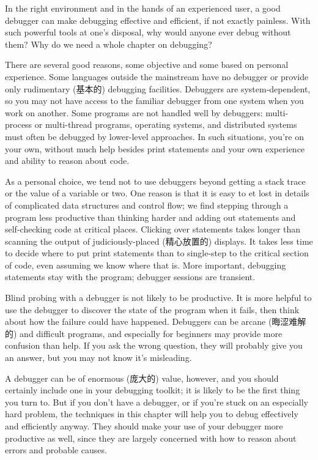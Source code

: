 In the right environment and in the hands of an experienced user, a good
debugger can make debugging effective and efficient, if not exactly
painless. With such powerful tools at one's disposal, why would anyone ever
debug without them? Why do we need a whole chapter on debugging?

There are several good reasons, some objective and some based on personal
experience. Some languages outside the mainstream have no debugger or
provide only rudimentary (基本的) debugging facilities. Debuggers are
system-dependent, so you may not have access to the familiar debugger from
one system when you work on another. Some programs are not handled well by
debuggers: multi-process or multi-thread programs, operating systems, and
distributed systems must often be debugged by lower-level approaches. In
such situations, you're on your own, without much help besides print
statements and your own experience and ability to reason about code.

As a personal choice, we tend not to use debuggers beyond getting a stack
trace or the value of a variable or two. One reason is that it is easy to
et lost in details of complicated data structures and control flow; we find
stepping through a program less productive than thinking harder and adding
out statements and self-checking code at critical places. Clicking over
statements takes longer than scanning the output of judiciously-placed
(精心放置的) displays. It takes less time to decide where to put print
statements than to single-step to the critical section of code, even
assuming we know where that is. More important, debugging statements stay
with the program; debugger sessions are transient.

Blind probing with a debugger is not likely to be productive. It is more
helpful to use the debugger to discover the state of the program when it
fails, then think about how the failure could have happened. Debuggers can
be arcane (晦涩难解的) and difficult programs, and especially for beginners
may provide more confusion than help. If you ask the wrong question, they
will probably give you an answer, but you may not know it's misleading.

A debugger can be of enormous (庞大的) value, however, and you should
certainly include one in your debugging toolkit; it is likely to be the
first thing you turn to. But if you don't have a debugger, or if you're
stuck on an especially hard problem, the techniques in this chapter will
help you to debug effectively and efficiently anyway. They should make your
use of your debugger more productive as well, since they are largely
concerned with how to reason about errors and probable causes.

